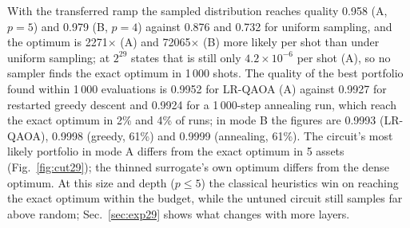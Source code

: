 With the transferred ramp the sampled distribution reaches quality 0.958 (A, $p=5$) and 0.979 (B, $p=4$) against 0.876 and 0.732 for uniform sampling, and the optimum is 2271$\times$ (A) and 72065$\times$ (B) more likely per shot than under uniform sampling; at $2^{29}$ states that is still only $4.2\times10^{-6}$ per shot (A), so no sampler finds the exact optimum in 1\,000 shots. The quality of the best portfolio found within 1\,000 evaluations is 0.9952 for LR-QAOA (A) against 0.9927 for restarted greedy descent and 0.9924 for a 1\,000-step annealing run, which reach the exact optimum in 2\% and 4\% of runs; in mode B the figures are 0.9993 (LR-QAOA), 0.9998 (greedy, 61\%) and 0.9999 (annealing, 61\%). The circuit's most likely portfolio in mode A differs from the exact optimum in 5 assets (Fig.~\ref{fig:cut29}); the thinned surrogate's own optimum differs from the dense optimum. At this size and depth ($p\le 5$) the classical heuristics win on reaching the exact optimum within the budget, while the untuned circuit still samples far above random; Sec.~\ref{sec:exp29} shows what changes with more layers.
